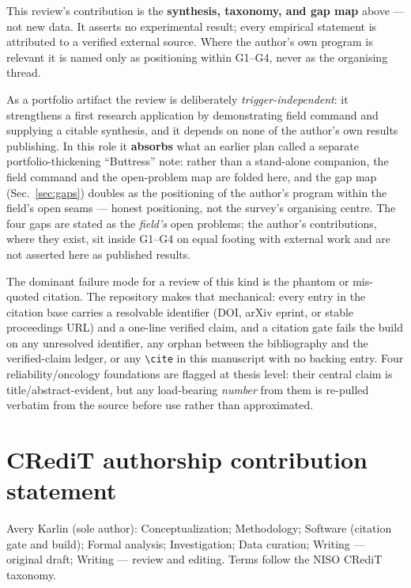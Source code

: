 \documentclass[review,number]{elsarticle}
\begin{document}
This review's contribution is the \textbf{synthesis, taxonomy, and gap map} above --- not
new data. It asserts no experimental result; every empirical statement is attributed to a
verified external source. Where the author's own program is relevant it is named only as
positioning within G1--G4, never as the organising thread.

As a portfolio artifact the review is deliberately \emph{trigger-independent}: it
strengthens a first research application by demonstrating field command and supplying a
citable synthesis, and it depends on none of the author's own results publishing. In this
role it \textbf{absorbs} what an earlier plan called a separate portfolio-thickening
``Buttress'' note: rather than a stand-alone companion, the field command and the
open-problem map are folded here, and the gap map (Sec.~\ref{sec:gaps}) doubles as the
positioning of the author's program within the field's open seams --- honest positioning,
not the survey's organising centre. The four gaps are stated as the \emph{field's} open
problems; the author's contributions, where they exist, sit inside G1--G4 on equal
footing with external work and are not asserted here as published results.

The dominant failure mode for a review of this kind is the phantom or mis-quoted citation.
The repository makes that mechanical: every entry in the citation base carries a resolvable
identifier (DOI, arXiv eprint, or stable proceedings URL) and a one-line verified claim,
and a citation gate fails the build on any unresolved identifier, any orphan between the
bibliography and the verified-claim ledger, or any \verb|\cite| in this manuscript with no
backing entry. Four reliability/oncology foundations are flagged at thesis level: their
central claim is title/abstract-evident, but any load-bearing \emph{number} from them is
re-pulled verbatim from the source before use rather than approximated.


\section*{CRediT authorship contribution statement}
Avery Karlin (sole author): Conceptualization; Methodology; Software (citation gate
and build); Formal analysis; Investigation; Data curation; Writing --- original draft;
Writing --- review and editing. Terms follow the NISO CRediT taxonomy.
\end{document}
